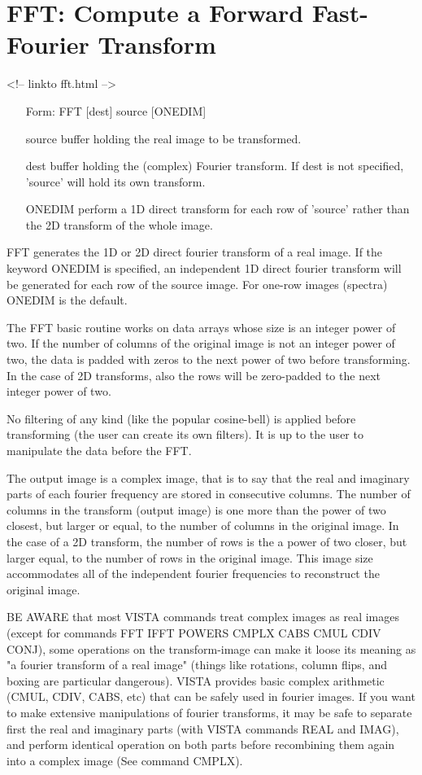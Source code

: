 \section{FFT: Compute a Forward Fast-Fourier Transform}
\begin{rawhtml}
<!-- linkto fft.html -->
\end{rawhtml}
\begin{itemize}
  \item[Form: FFT  {[dest]} source {[ONEDIM]}\hfill]{}
  \item[source]{buffer holding the real image to be transformed.}
  \item[dest]{buffer holding the (complex) Fourier transform. If dest
       is not specified, 'source' will hold its own transform.}
  \item[ONEDIM]{perform a 1D direct transform for each row of 'source'
       rather than the 2D transform of the whole image.}
\end{itemize}

FFT generates the 1D or 2D direct fourier transform of a real image. If the
keyword ONEDIM is specified, an independent 1D direct fourier transform
will be generated for each row of the source image. For one-row images
(spectra) ONEDIM is the default.

The FFT basic routine works on data arrays whose size is an integer power
of two. If the number of columns of the original image is not an integer
power of two, the data is padded with zeros to the next power of two before
transforming. In the case of 2D transforms, also the rows will be
zero-padded to the next integer power of two.

No filtering of any kind (like the popular cosine-bell) is applied before
transforming (the user can create its own filters). It is up to the user to
manipulate the data before the FFT.

The output image is a complex image, that is to say that the real and
imaginary parts of each fourier frequency are stored in consecutive
columns. The number of columns in the transform (output image) is one more
than the power of two closest, but larger or equal, to the number of
columns in the original image. In the case of a 2D transform, the number of
rows is the a power of two closer, but larger equal, to the number of rows
in the original image. This image size accommodates all of the independent
fourier frequencies to reconstruct the original image.

BE AWARE that most VISTA commands treat complex images as real images
(except for commands FFT IFFT POWERS CMPLX CABS CMUL CDIV CONJ), some
operations on the transform-image can make it loose its meaning as "a
fourier transform of a real image" (things like rotations, column flips,
and boxing are particular dangerous). VISTA provides basic complex
arithmetic (CMUL, CDIV, CABS, etc) that can be safely used in fourier
images. If you want to make extensive manipulations of fourier transforms,
it may be safe to separate first the real and imaginary parts (with VISTA
commands REAL and IMAG), and perform identical operation on both parts
before recombining them again into a complex image (See command CMPLX).

